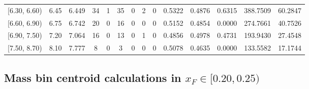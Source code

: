\begin{table}[htbp]
{\begin{tabular}{cc|c|cccccc|ccc|cc}
        {[6.30, 6.60)} & 6.45 & 6.449 & 34 & 1 & 35 & 0 & 2 & 0 & 0.5322 & 0.4876 & 0.6315 & 388.7509 & 60.2847 \\
        {[6.60, 6.90)} & 6.75 & 6.742 & 20 & 0 & 16 & 0 & 0 & 0 & 0.5152 & 0.4854 & 0.0000 & 274.7661 & 40.7526 \\
        {[6.90, 7.50)} & 7.20 & 7.064 & 16 & 0 & 13 & 0 & 1 & 0 & 0.4856 & 0.4978 & 0.4731 & 193.9430 & 27.4548 \\
        {[7.50, 8.70)} & 8.10 & 7.777 & 8 & 0 & 3 & 0 & 0 & 0 & 0.5078 & 0.4635 & 0.0000 & 133.5582 & 17.1744 \\
        \hline\hline
    \end{tabular}
    }
\end{table}

\clearpage
\subsection{\texorpdfstring{Mass bin centroid calculations in $x_F \in [0.20, 0.25)$}{Mass bin centroid calculations in x\_F in [0.20, 0.25)]}}

